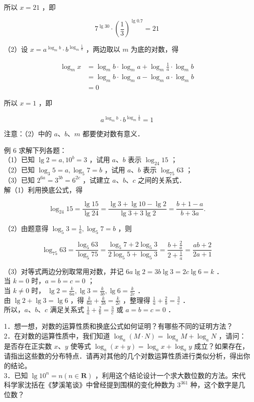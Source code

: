 \documentclass[10pt]{article}
\begin{document}
所以 \(x=21\) ，即

\[
7^{\lg 30} \cdot\left(\frac{1}{3}\right)^{\lg 0.7}=21
\]

（2）设 \(x=a^{\log _{m} b} \cdot b^{\log _{m} \frac{1}{a}}\) ，两边取以 \(m\) 为底的对数，得

\[
\begin{aligned}
\log _{m} x & =\log _{m} b \cdot \log _{m} a+\log _{m} \frac{1}{a} \cdot \log _{m} b \\
& =\log _{m} b \cdot \log _{m} a-\log _{m} a \cdot \log _{m} b \\
& =0
\end{aligned}
\]

所以 \(x=1\) ，即

\[
a^{\log _{m} b} \cdot b^{\log _{m} \frac{1}{a}}=1
\]

注意：（2）中的 \(a 、 b 、 m\) 都要使对数有意义．

例 6 求解下列各题：\\
（1）已知 \(\lg 2=a, 10^{b}=3\) ，试用 \(a 、 b\) 表示 \(\log _{24} 15\) ；\\
（2）已知 \(\log _{3} 5=a, \log _{5} 7=b\) ，试用 \(a 、 b\) 表示 \(\log _{75} 63\) ；\\
（3）已知 \(2^{6 a}=3^{3 b}=6^{2 c}\) ，试建立 \(a 、 b 、 c\) 之间的关系式．\\
解（1）利用换底公式，得

\[
\log _{24} 15=\frac{\lg 15}{\lg 24}=\frac{\lg 3+\lg 10-\lg 2}{\lg 3+3 \lg 2}=\frac{b+1-a}{b+3 a} .
\]

（2）由题意得 \(\log _{5} 3=\frac{1}{a}, \log _{5} 7=b\) ，则

\[
\log _{75} 63=\frac{\log _{5} 63}{\log _{5} 75}=\frac{\log _{5} 7+2 \log _{5} 3}{2 \log _{5} 5+\log _{5} 3}=\frac{b+\frac{2}{a}}{2+\frac{1}{a}}=\frac{a b+2}{2 a+1}
\]

（3）对等式两边分别取常用对数，并记 \(6 a \lg 2=3 b \lg 3=2 c \lg 6=k\) ．\\
当 \(k=0\) 时，\(a=b=c=0\) ；\\
当 \(k \neq 0\) 时， \(\lg 2=\frac{k}{6 a}, \lg 3=\frac{k}{3 b}, \lg 6=\frac{k}{2 c}\) ．\\
由 \(\lg 2+\lg 3=\lg 6\) ，得 \(\frac{k}{6 a}+\frac{k}{3 b}=\frac{k}{2 c}\) ，整理得 \(\frac{1}{a}+\frac{2}{b}=\frac{3}{c}\) ．\\
所以，\(a 、 b 、 c\) 满足关系式 \(\frac{1}{a}+\frac{2}{b}=\frac{3}{c}\) 或 \(a=b=c=0\) ．

1．想一想，对数的运算性质和换底公式如何证明？有哪些不同的证明方法？\\
2．在对数的运算性质中，我们知道 \(\log _{a}(M \cdot N)=\log _{a} M+\log _{a} N\) ，请问：是否存在正实数 \(x 、 y\) 使等式 \(\log _{a}(x+y)=\log _{a} x+\log _{a} y\) 成立？如果存在，请指出这些数的分布特点．请再对其他的几个对数运算性质进行类似分析，得出你的结论。\\
3．已知 \(\lg 10^{n}=n(n \in \mathbf{R})\) ，利用这个结论设计一个求大数位数的方法。宋代科学家沈括在《梦溪笔谈》中曾经提到围棋的变化种数为 \(3^{361}\) 种，这个数字是几位数？
\end{document}
